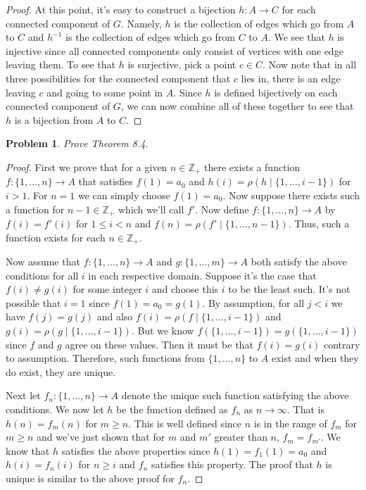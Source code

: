 \documentclass{article}
\newtheorem{problem}{Problem}
\begin{document}
\begin{proof}
At this point, it's easy to construct a bijection $h : A \to C$ for each connected component of $G$. Namely, $h$ is the collection of edges which go from $A$ to $C$ and $h^{-1}$ is the collection of edges which go from $C$ to $A$. We see that $h$ is injective since all connected components only consist of vertices with one edge leaving them. To see that $h$ is surjective, pick a point $c \in C$. Now note that in all three possibilities for the connected component that $c$ lies in, there is an edge leaving $c$ and going to some point in $A$. Since $h$ is defined bijectively on each connected component of $G$, we can now combine all of these together to see that $h$ is a bijection from $A$ to $C$.
\end{proof}

\begin{problem}
Prove Theorem 8.4.
\end{problem}
\begin{proof}
First we prove that for a given $n \in \mathbb{Z}_+$ there exists a function $f : \{1, \dots , n\} \to A$ that satisfies $f(1) = a_0$ and $h(i) = \rho(h \mid \{1, \dots , i-1\})$ for $i > 1$. For $n = 1$ we can simply choose $f(1) = a_0$. Now suppose there exists such a function for $n-1 \in \mathbb{Z}_+$ which we'll call $f'$. Now define $f : \{1, \dots , n\} \to A$ by $f(i) = f'(i)$ for $1 \leq i < n$ and $f(n) = \rho(f' \mid \{1, \dots , n-1\})$. Thus, such a function exists for each $n \in \mathbb{Z}_+$.

Now assume that $f : \{1, \dots , n\} \to A$ and $g : \{1, \dots , m\} \to A$ both satisfy the above conditions for all $i$ in each respective domain. Suppose it's the case that $f(i) \neq g(i)$ for some integer $i$ and choose this $i$ to be the least such. It's not possible that $i = 1$ since $f(1) = a_0 = g(1)$. By assumption, for all $j < i$ we have $f(j) = g(j)$ and also $f(i) = \rho(f \mid \{1, \dots , i-1\})$ and $g(i) = \rho(g \mid \{1, \dots , i-1\})$. But we know $f(\{1, \dots , i-1\}) = g(\{1, \dots , i-1\})$ since $f$ and $g$ agree on these values. Then it must be that $f(i) = g(i)$ contrary to assumption. Therefore, such functions from $\{1, \dots , n\}$ to $A$ exist and when they do exist, they are unique.

Next let $f_n : \{1, \dots , n\} \to A$ denote the unique such function satisfying the above conditions. We now let $h$ be the function defined as $f_n$ as $n \rightarrow \infty$. That is $h(n) = f_m(n)$ for $m \geq n$. This is well defined since $n$ is in the range of $f_m$ for $m \geq n$ and we've just shown that for $m$ and $m'$ greater than $n$, $f_m = f_{m'}$. We know that $h$ satisfies the above properties since $h(1) = f_1(1) = a_0$ and $h(i) = f_n(i)$ for $n \geq i$ and $f_n$ satisfies this property. The proof that $h$ is unique is similar to the above proof for $f_n$.
\end{proof}
\end{document}
